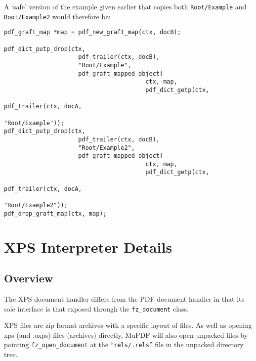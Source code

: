 \documentclass[oneside]{book}
\begin{document}
A `safe' version of the example given earlier that copies both \texttt{Root/Example} and \texttt{Root/Example2} would therefore be:

\begin{lstlisting}
pdf_graft_map *map = pdf_new_graft_map(ctx, docB);

pdf_dict_putp_drop(ctx,
                     pdf_trailer(ctx, docB),
                     "Root/Example",
                     pdf_graft_mapped_object(
                                        ctx, map,
                                        pdf_dict_getp(ctx,
                                                        pdf_trailer(ctx, docA,
                                                        "Root/Example"));
pdf_dict_putp_drop(ctx,
                     pdf_trailer(ctx, docB),
                     "Root/Example2",
                     pdf_graft_mapped_object(
                                        ctx, map,
                                        pdf_dict_getp(ctx,
                                                        pdf_trailer(ctx, docA,
                                                        "Root/Example2"));
pdf_drop_graft_map(ctx, map);
\end{lstlisting}





\chapter{XPS Interpreter Details}
\label{XPSInterpreter}

\section{Overview}

The XPS document handler differs from the PDF document handler in that its sole interface is that exposed through the \texttt{fz\_document} class.

XPS files are zip format archives with a specific layout of files. As well as opening xps (and .oxps) files (archives) directly, MuPDF will also open unpacked files by pointing \texttt{fz\_open\_document} at the ``\texttt{rels/.rels}'' file in the unpacked directory tree.
\end{document}
